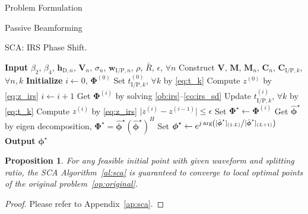 \documentclass[journal,12pt,onecolumn,draftclsnofoot]{IEEEtran}
\newtheorem{proposition}{Proposition}
\begin{document}
\begin{section}{Problem Formulation}
\begin{subsection}{Passive Beamforming}
			\begin{algorithm}[!t]
				\caption{SCA: IRS Phase Shift.}
				\label{al:sca}
				\begin{algorithmic}[1]
					\State \textbf{Input} $\beta_2$, $\beta_4$, $\boldsymbol{h}_{\mathrm{D},n}$, $\boldsymbol{V}_{n}$, $\sigma_n$, $\boldsymbol{w}_{\mathrm{I/P},n}$, $\rho$, $\bar{R}$, $\epsilon$, $\forall n$
					\State Construct $\boldsymbol{V}$, $\boldsymbol{M}$, $\boldsymbol{M}_n$, $\boldsymbol{C}_{n}$, $\boldsymbol{C}_{\mathrm{I/P},k}$, $\forall n,k$
					\State \textbf{Initialize} $i \gets 0$, $\boldsymbol{\Phi}^{(0)}$
					\State Set $t_{\mathrm{I/P},k}^{(0)}$, $\forall k$ by \eqref{eq:t_k}
					\State Compute $z^{(0)}$ by \eqref{eq:z_irs}
					\Repeat
						\State $i \gets i + 1$
						\State Get $\boldsymbol{\Phi}^{(i)}$ by solving \eqref{ob:irs}--\eqref{co:irs_sd}
						\State Update $t_{\mathrm{I/P},k}^{(i)}$, $\forall k$ by \eqref{eq:t_k}
						\State Compute $z^{(i)}$ by \eqref{eq:z_irs}
					\Until $\lvert z^{(i)}-z^{(i-1)} \rvert \le \epsilon$
					\State Set $\boldsymbol{\Phi}^{\star} \gets \boldsymbol{\Phi}^{(i)}$
					\State Get $\hat{\boldsymbol{\phi}}^\star$ by eigen decomposition, $\boldsymbol{\Phi}^{\star}=\hat{\boldsymbol{\phi}}^\star(\hat{\boldsymbol{\phi}}^\star)^H$
					\State Set $\boldsymbol{\phi}^{\star} \gets e^{j \arg\left([\hat{\boldsymbol{\phi}}^\star]_{(1:L)} \middle/ [\hat{\boldsymbol{\phi}}^\star]_{(L+1)}\right)}$
					\State \textbf{Output} $\boldsymbol{\phi}^{\star}$
				\end{algorithmic}
			\end{algorithm}

			\begin{proposition}\label{pr:sca}
				For any feasible initial point with given waveform and splitting ratio, the SCA Algorithm~\ref{al:sca} is guaranteed to converge to local optimal points of the original problem~\eqref{op:original}.
			\end{proposition}

			\begin{proof}\label{pf:sca}
				Please refer to Appendix~\ref{ap:sca}.
			\end{proof}
		\end{subsection}


\end{section}
\end{document}
